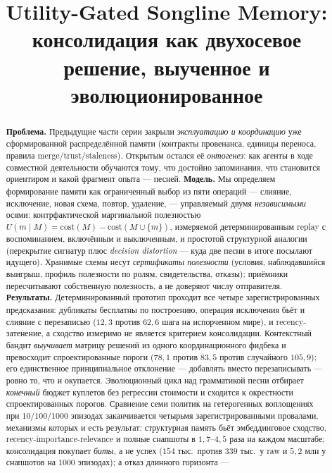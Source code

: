 \documentclass{article}
\title{Utility-Gated Songline Memory:\\консолидация как
двухосевое решение, выученное и эволюционированное}
\begin{document}
\maketitle

\begin{abstract}
\textbf{Проблема.} Предыдущие части серии закрыли
\emph{эксплуатацию и координацию} уже сформированной распределённой
памяти (контракты провенанса, единицы переноса, правила
merge/trust/staleness). Открытым остался её \emph{онтогенез}: как
агенты в ходе совместной деятельности обучаются тому, что достойно
запоминания, что становится ориентиром и какой фрагмент опыта ---
песней.
\textbf{Модель.} Мы определяем формирование памяти как ограниченный
выбор из пяти операций --- слияние, исключение, новая схема, повтор,
удаление, --- управляемый двумя \emph{независимыми} осями:
контрфактической маргинальной полезностью $U(m \mid M) =
\mathrm{cost}(M) - \mathrm{cost}(M \cup \{m\})$, измеряемой
детерминированным replay с воспоминанием, включённым и выключенным, и
простотой структурной аналогии (перекрытие сигнатур плюс
\emph{decision distortion} --- куда две песни в итоге посылают
идущего). Хранимые схемы несут \emph{сертификаты полезности}
(условия, наблюдавшийся выигрыш, профиль полезности по ролям,
свидетельства, отказы); приёмники пересчитывают собственную
полезность, а не доверяют числу отправителя.
\textbf{Результаты.} Детерминированный прототип проходит все четыре
зарегистрированных предсказания: дубликаты бесплатны по построению,
операция исключения бьёт и слияние с перезаписью ($12{,}3$ против
$62{,}6$ шага на испорченном мире), и recency-затенение, а сходство
измеримо не является критерием консолидации. Контекстный бандит
\emph{выучивает} матрицу решений из одного координационного фидбека и
превосходит спроектированные пороги ($78{,}1$ против $83{,}5$ против
случайного $105{,}9$); его единственное принципиальное отклонение ---
добавлять вместо перезаписывать --- ровно то, что и окупается.
Эволюционный цикл над грамматикой песни отбирает \emph{конечный}
бюджет куплетов без регрессии стоимости и сходится к окрестности
спроектированных порогов. Сравнение семи политик на гетерогенных
воплощениях при $10/100/1000$ эпизодах заканчивается четырьмя
зарегистрированными провалами, механизмы которых и есть результат:
структурная память бьёт эмбеддинговое сходство,
recency-importance-relevance и полные снапшоты в $1{,}7$--$4{,}5$
раза на каждом масштабе; консолидация покупает \emph{биты}, а не
успех ($154$ тыс.\ против $339$ тыс.\ у raw и $5{,}2$ млн у
снапшотов на $1000$ эпизодах); а отказ длинного горизонта ---

\end{abstract}
\end{document}
